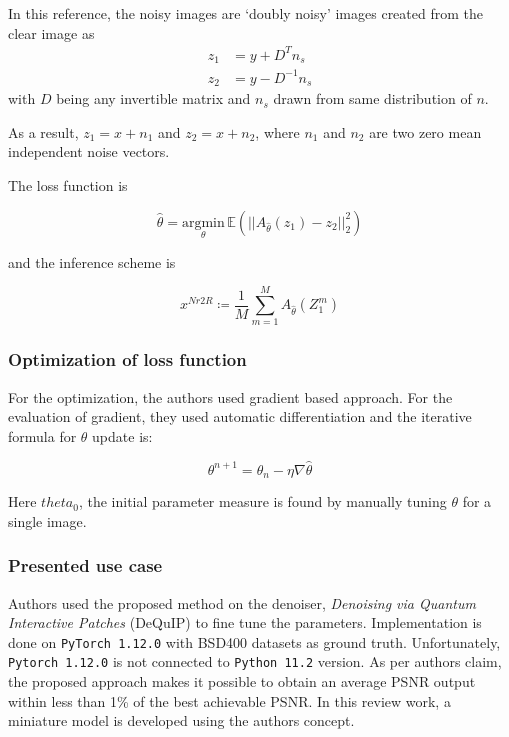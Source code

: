 \documentclass[
]{agujournal2019}
\begin{document}
In this reference, the noisy images are `doubly noisy' images created
from the clear image as \begin{align*}
z_1&=y+D^Tn_s\\
z_2&=y-D^{-1}n_s
\end{align*} with \(D\) being any invertible matrix and \(n_s\) drawn
from same distribution of \(n\).

As a result, \(z_1=x+n_1\) and \(z_2=x+n_2\), where \(n_1\) and \(n_2\)
are two zero mean independent noise vectors.

The loss function is

\[ \hat{\theta}=\underset{\theta}{\mathrm{argmin}}\,\mathbb{E} \left(||A_{\hat{\theta}} (z_1)-z_2||^2_2\right)\]

and the inference scheme is

\[x^{Nr2R}\coloneqq \frac{1}{M}\sum\limits_{m=1}^MA_{\hat{\theta}}(Z_1^m)\]

\subsubsection{Optimization of loss
function}\label{optimization-of-loss-function}

For the optimization, the authors used gradient based approach. For the
evaluation of gradient, they used automatic differentiation and the
iterative formula for \(\theta\) update is:

\[\theta^{n+1}=\theta_n-\eta \nabla \hat{\theta}\]

Here \(theta_0\), the initial parameter measure is found by manually
tuning \(\theta\) for a single image.

\subsubsection{Presented use case}\label{presented-use-case}

Authors used the proposed method on the denoiser, \emph{Denoising via
Quantum Interactive Patches} (DeQuIP) to fine tune the parameters.
Implementation is done on \texttt{PyTorch\ 1.12.0} with BSD400 datasets
as ground truth. Unfortunately, \texttt{Pytorch\ 1.12.0} is not
connected to \texttt{Python\ 11.2} version. As per authors claim, the
proposed approach makes it possible to obtain an average PSNR output
within less than 1\% of the best achievable PSNR. In this review work, a
miniature model is developed using the authors concept.
\end{document}
